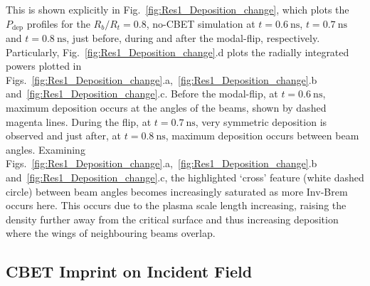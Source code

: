 This is shown explicitly in Fig.~\ref{fig:Res1_Deposition_change}, which plots the $P_\text{dep}$ profiles for the $R_b/R_t=0.8$, no-\ac{CBET} simulation at $t=0.6\ \text{ns}$, $t=0.7\ \text{ns}$ and $t=0.8\ \text{ns}$,  just before, during and after the modal-flip, respectively.
Particularly, Fig.~\ref{fig:Res1_Deposition_change}.d plots the radially integrated powers plotted in Figs.~\ref{fig:Res1_Deposition_change}.a,~\ref{fig:Res1_Deposition_change}.b and~\ref{fig:Res1_Deposition_change}.c.
Before the modal-flip, at $t=0.6\ \text{ns}$, maximum deposition occurs at the angles of the beams, shown by dashed magenta lines.
During the flip, at $t=0.7\ \text{ns}$, very symmetric deposition is observed and just after, at $t=0.8\ \text{ns}$, maximum deposition occurs between beam angles.
Examining Figs.~\ref{fig:Res1_Deposition_change}.a,~\ref{fig:Res1_Deposition_change}.b and~\ref{fig:Res1_Deposition_change}.c, the highlighted `cross' feature (white dashed circle) between beam angles becomes increasingly saturated as more \ac{Inv-Brem} occurs here.
This occurs due to the plasma scale length increasing, raising the density further away from the critical surface and thus increasing deposition where the wings of neighbouring beams overlap.

\subsection{CBET Imprint on Incident Field}%
\label{sec:Res1_CBET_imprint}

